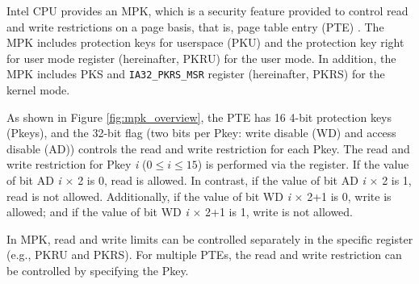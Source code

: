 
Intel CPU provides an MPK, which is a security feature provided to control read
and write restrictions on a page basis, that is, page table entry (PTE)
\cite{intel-mpk}.
%
The MPK includes protection keys for userspace (PKU) and the protection key
right for user mode register (hereinafter, PKRU) for the user mode.
In addition, the MPK includes PKS and \verb|IA32_PKRS_MSR| register
(hereinafter, PKRS) for the kernel mode.

As shown in Figure \ref{fig:mpk_overview}, the PTE has 16 4-bit protection keys
(Pkeys), and the 32-bit flag (two bits per Pkey: write disable (WD) and access
disable (AD)) controls the read and write restriction for each Pkey.
%
The read and write restriction for Pkey {\it i} ($0 \leq i \leq 15$) is performed via the
register. If the value of bit AD {\it i} $\times$ 2 is 0, read is allowed. In contrast,
if the value of bit AD {\it i} $\times$ 2 is 1, read is not allowed.
%
Additionally, if the value of bit WD {\it i} $\times$ 2+1 is 0, write is allowed; and if the
value of bit WD {\it i} $\times$ 2+1 is 1, write is not allowed.

In MPK, read and write limits can be controlled separately in the specific
register (e.g., PKRU and PKRS). For multiple PTEs, the read and write
restriction can be controlled by specifying the Pkey.







